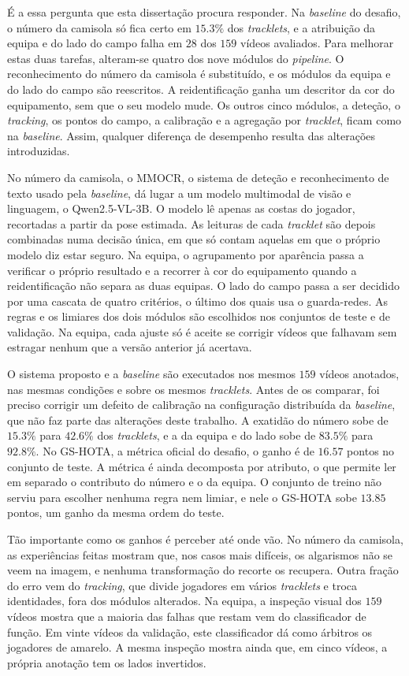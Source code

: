 É a essa pergunta que esta dissertação procura responder. Na \emph{baseline} do desafio, o número da camisola só fica certo em $15.3\%$ dos \emph{tracklets}, e a atribuição da equipa e do lado do campo falha em $28$ dos $159$ vídeos avaliados. Para melhorar estas duas tarefas, alteram-se quatro dos nove módulos do \emph{pipeline}. O reconhecimento do número da camisola é substituído, e os módulos da equipa e do lado do campo são reescritos. A reidentificação ganha um descritor da cor do equipamento, sem que o seu modelo mude. Os outros cinco módulos, a deteção, o \emph{tracking}, os pontos do campo, a calibração e a agregação por \emph{tracklet}, ficam como na \emph{baseline}. Assim, qualquer diferença de desempenho resulta das alterações introduzidas.

No número da camisola, o MMOCR, o sistema de deteção e reconhecimento de texto usado pela \emph{baseline}, dá lugar a um modelo multimodal de visão e linguagem, o Qwen2.5-VL-3B. O modelo lê apenas as costas do jogador, recortadas a partir da pose estimada. As leituras de cada \emph{tracklet} são depois combinadas numa decisão única, em que só contam aquelas em que o próprio modelo diz estar seguro. Na equipa, o agrupamento por aparência passa a verificar o próprio resultado e a recorrer à cor do equipamento quando a reidentificação não separa as duas equipas. O lado do campo passa a ser decidido por uma cascata de quatro critérios, o último dos quais usa o guarda-redes. As regras e os limiares dos dois módulos são escolhidos nos conjuntos de teste e de validação. Na equipa, cada ajuste só é aceite se corrigir vídeos que falhavam sem estragar nenhum que a versão anterior já acertava.

O sistema proposto e a \emph{baseline} são executados nos mesmos $159$ vídeos anotados, nas mesmas condições e sobre os mesmos \emph{tracklets}. Antes de os comparar, foi preciso corrigir um defeito de calibração na configuração distribuída da \emph{baseline}, que não faz parte das alterações deste trabalho. A exatidão do número sobe de $15.3\%$ para $42.6\%$ dos \emph{tracklets}, e a da equipa e do lado sobe de $83.5\%$ para $92.8\%$. No GS-HOTA, a métrica oficial do desafio, o ganho é de $16.57$ pontos no conjunto de teste. A métrica é ainda decomposta por atributo, o que permite ler em separado o contributo do número e o da equipa. O conjunto de treino não serviu para escolher nenhuma regra nem limiar, e nele o GS-HOTA sobe $13.85$ pontos, um ganho da mesma ordem do teste.

Tão importante como os ganhos é perceber até onde vão. No número da camisola, as experiências feitas mostram que, nos casos mais difíceis, os algarismos não se veem na imagem, e nenhuma transformação do recorte os recupera. Outra fração do erro vem do \emph{tracking}, que divide jogadores em vários \emph{tracklets} e troca identidades, fora dos módulos alterados. Na equipa, a inspeção visual dos $159$ vídeos mostra que a maioria das falhas que restam vem do classificador de função. Em vinte vídeos da validação, este classificador dá como árbitros os jogadores de amarelo. A mesma inspeção mostra ainda que, em cinco vídeos, a própria anotação tem os lados invertidos.

